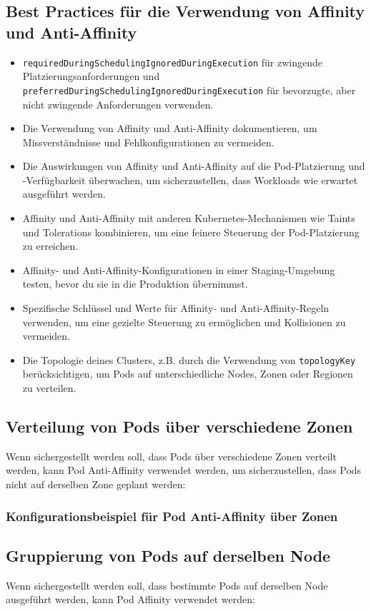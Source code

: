 \subsection{Best Practices für die Verwendung von Affinity und Anti-Affinity}
\begin{itemize}
    \item \texttt{requiredDuringSchedulingIgnoredDuringExecution} für zwingende Platzierungsanforderungen und \texttt{preferredDuringSchedulingIgnoredDuringExecution} für bevorzugte, aber nicht zwingende Anforderungen verwenden.
    \item Die Verwendung von Affinity und Anti-Affinity dokumentieren, um Missverständnisse und Fehlkonfigurationen zu vermeiden.
    \item Die Auswirkungen von Affinity und Anti-Affinity auf die Pod-Platzierung und -Verfügbarkeit überwachen, um sicherzustellen, dass Workloads wie erwartet ausgeführt werden.
    \item Affinity und Anti-Affinity mit anderen Kubernetes-Mechanismen wie Taints und Tolerations kombinieren, um eine feinere Steuerung der Pod-Platzierung zu erreichen.
    \item Affinity- und Anti-Affinity-Konfigurationen in einer Staging-Umgebung testen, bevor du sie in die Produktion übernimmst.
    \item Spezifische Schlüssel und Werte für Affinity- und Anti-Affinity-Regeln verwenden, um eine gezielte Steuerung zu ermöglichen und Kollisionen zu vermeiden.
    \item Die Topologie deines Clusters, z.B. durch die Verwendung von \texttt{topologyKey} berücksichtigen, um Pods auf unterschiedliche Nodes, Zonen oder Regionen zu verteilen.
\end{itemize}
\newpage
\subsection{Verteilung von Pods über verschiedene Zonen}
Wenn sichergestellt werden soll, dass Pods über verschiedene Zonen verteilt werden, kann Pod Anti-Affinity verwendet werden, um sicherzustellen, dass Pods nicht auf derselben Zone geplant werden:

\subsubsection{Konfigurationsbeispiel für Pod Anti-Affinity über Zonen}



\subsection{Gruppierung von Pods auf derselben Node}
Wenn sichergestellt werden soll, dass bestimmte Pods auf derselben Node ausgeführt werden, kann Pod Affinity verwendet werden:

